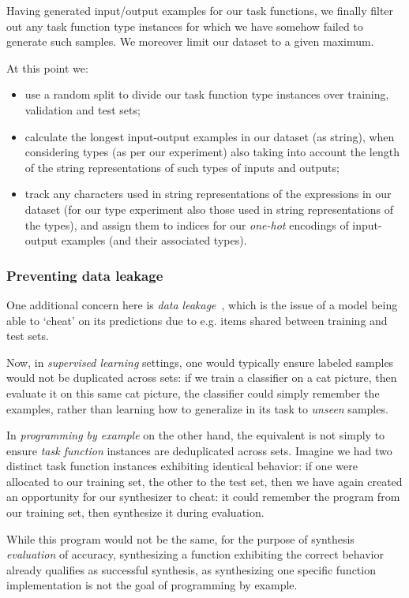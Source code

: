 \documentclass{article}
\begin{document}
Having generated input/output examples for our task functions,
we finally filter out any task function type instances for which we have somehow failed to generate such samples.
We moreover limit our dataset to a given maximum.

At this point we:
\begin{itemize}
    \item use a random split to divide our task function type instances over training, validation and test sets;
    \item calculate the longest input-output examples in our dataset (as string), when considering types (as per our experiment) also taking into account the length of the string representations of such types of inputs and outputs;
    \item track any characters used in string representations of the expressions in our dataset
    (for our type experiment also those used in string representations of the types),
    and assign them to indices for our \emph{one-hot} encodings of input-output examples (and their associated types).
\end{itemize}

\subsubsection{Preventing data leakage}

One additional concern here is \emph{data leakage}~\citep{leakage},
which is the issue of a model being able to `cheat' on its predictions due to e.g. items shared between training and test sets.

Now, in \emph{supervised learning} settings,
one would typically ensure labeled samples would not be duplicated across sets:
if we train a classifier on a cat picture,
then evaluate it on this same cat picture,
the classifier could simply remember the examples,
rather than learning how to generalize in its task to \emph{unseen} samples.

In \emph{programming by example} on the other hand,
the equivalent is not simply to ensure \emph{task function} instances are deduplicated across sets.
Imagine we had two distinct task function instances exhibiting identical behavior:
if one were allocated to our training set, the other to the test set,
then we have again created an opportunity for our synthesizer to cheat:
it could remember the program from our training set,
then synthesize it during evaluation.

While this program would not be the same,
for the purpose of synthesis \emph{evaluation} of accuracy,
synthesizing a function exhibiting the correct behavior already qualifies as successful synthesis,
as synthesizing one specific function implementation is not the goal of programming by example.
\end{document}
